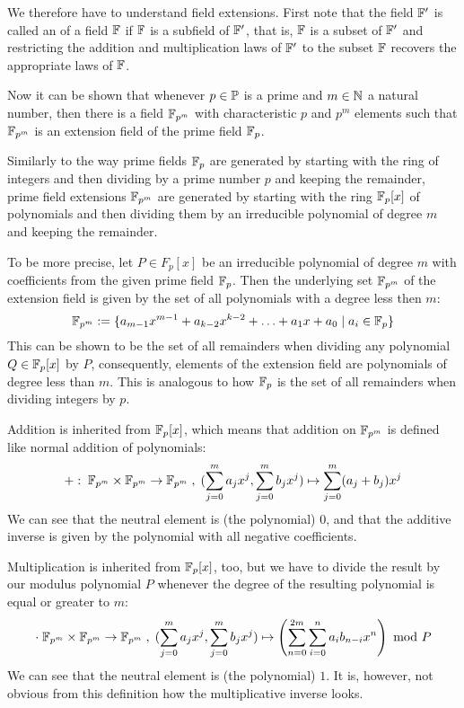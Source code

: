 We therefore have to understand field extensions. First note that the field $\mathbb{F}'$ is called an  of a field $\mathbb{F}$ if $\mathbb{F}$ is a subfield of $\mathbb{F}'$, that is, $\mathbb{F}$ is a subset of $\mathbb{F}'$ and restricting the addition and multiplication laws of $\mathbb{F}'$ to the subset $\mathbb{F}$ recovers the appropriate laws of $\mathbb{F}$.

Now it can be shown that whenever $p\in \mathbb{P}$ is a prime and $m\in\mathbb{N}$ a natural number, then there is a field $\mathbb{F}_{p^m}$ with characteristic $p$ and $p^m$ elements such that $\mathbb{F}_{p^m}$ is an extension field of the prime field $\mathbb{F}_p$.

Similarly to the way prime fields $\mathbb{F}_p$ are generated by starting with the ring of integers and then dividing by a prime number $p$ and keeping the remainder, prime field extensions $\mathbb{F}_{p^m}$ are generated by starting with the ring $\mathbb{F}_p[x]$ of polynomials and then dividing them by an irreducible polynomial of degree $m$ and keeping the remainder.

To be more precise, let $P\in F_p[x]$ be an irreducible polynomial of degree $m$ with coefficients from the given prime field $\mathbb{F}_p$. Then the underlying set $\mathbb{F}_{p^m}$ of the extension field is given by the set of all polynomials with a degree less then $m$:
\begin{equation}\label{eq:prime-extension-field}
\mathbb{F}_{p^m}:=\{a_{m-1} x^{m-1}+a_{k-2}x^{k-2}+\ldots+a_1 x+a_0\;|\; a_i\in \mathbb{F}_p\}
\end{equation}
This can be shown to be the set of all remainders when dividing any polynomial $Q\in \mathbb{F}_p[x]$ by $P$, consequently, elements of the extension field are polynomials of degree less than $m$. This is analogous to how $\mathbb{F}_p$ is the set of all remainders when dividing integers by $p$.

Addition is inherited from $\mathbb{F}_p[x]$, which means that addition on $\mathbb{F}_{p^m}$ is defined like normal addition of polynomials:
\begin{equation}
+:\; \mathbb{F}_{p^m}\times \mathbb{F}_{p^m} \to \mathbb{F}_{p^m}\; ,\; (\sum_{j=0}^m a_j x^j,\sum_{j=0}^m b_j x^j)\mapsto \sum_{j=0}^m (a_j+b_j) x^j
\end{equation}
We can see that the neutral element is (the polynomial) $0$, and that the additive inverse is given by the polynomial with all negative coefficients.

Multiplication is inherited from $\mathbb{F}_p[x]$, too, but we have to divide the result by our modulus polynomial $P$ whenever the degree of the resulting polynomial is equal or greater to $m$:
\begin{equation}
\cdot\; \mathbb{F}_{p^m}\times \mathbb{F}_{p^m} \to \mathbb{F}_{p^m}\; ,\; (\sum_{j=0}^m a_j x^j,\sum_{j=0}^m b_j x^j)\mapsto \left(\sum _{n = 0} ^{2m} \sum _{i = 0} ^{n}{a} _{i }{{b} _{n-i}}{x} ^{n}\right) \text{ mod } P
\end{equation}
We can see that the neutral element is (the polynomial) $1$. It is, however, not obvious from this definition how the multiplicative inverse looks.

